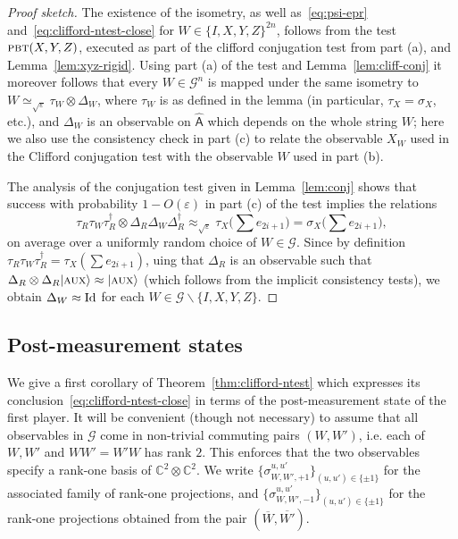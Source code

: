 \documentclass[11pt]{article}
\theoremstyle{remark}
\theoremstyle{definition}
\newcommand{\ket}[1]{|#1\rangle}
\newcommand{\Id}{\ensuremath{\mathop{\rm Id}\nolimits}}
\newcommand{\reg}[1]{{\textsf{#1}}}
\newcommand{\C}{\ensuremath{\mathbb{C}}}
\newcommand{\eps}{\varepsilon}
\newcommand{\pbt}{\textsc{pbt}}
\newcommand{\aux}{\textsc {aux}}
\begin{document}
\begin{proof}[Proof sketch]
The existence of the isometry, as well as~\eqref{eq:psi-epr} and~\eqref{eq:clifford-ntest-close} for $W \in \{I,X,Y,Z\}^{2n}$, follows from the test $\pbt(X,Y,Z)$, executed as part of the clifford conjugation test from part (a), and Lemma~\ref{lem:xyz-rigid}. 
Using part (a) of the test and Lemma~\ref{lem:cliff-conj} it moreover follows that every $W \in \mathcal{G}^n$ is mapped under the same isometry to $W \simeq_{\sqrt{\eps}} \tau_W \otimes \Delta_{W}$, where $\tau_W$ is as defined in the lemma (in particular, $\tau_X = \sigma_X$, etc.), and  $\Delta_W$ is an observable on $\hat{\reg{A}}$ which depends on the whole string $W$; 
 here we also use the consistency check in part (c) to relate  the observable $X_W$ used in the Clifford conjugation test with the observable $W$ used in part (b). 

The analysis of the conjugation test given in Lemma~\ref{lem:conj} shows that success with probability $1-O(\eps)$ in part (c) of the test implies the relations 
$$\tau_R \tau_W \tau_R^\dagger \otimes \Delta_R \Delta_W \Delta_R^\dagger \approx_{\sqrt{\eps}} \tau_X\big(\sum {e_{2i+1}}\big) = \sigma_X\big(\sum {e_{2i+1}}\big),$$
 on average over a uniformly random choice of $W\in \mathcal{G}$. Since by definition $\tau_R \tau_W \tau_R^\dagger = \tau_X(\sum e_{2i+1})$, uing that $\Delta_R$ is an observable such that $\Delta_R\otimes \Delta_R\ket{\aux}\approx\ket{\aux}$ (which follows from the implicit consistency tests), we obtain $\Delta_W \approx \Id$ for each $W\in\mathcal{G}\backslash\{I,X,Y,Z\}$. 

\end{proof}


\subsection{Post-measurement states}

We give a first corollary of Theorem~\ref{thm:clifford-ntest} which expresses its conclusion~\eqref{eq:clifford-ntest-close} in terms of the post-measurement state of the first player. It will be convenient (though not necessary) to assume that all observables in $\mathcal{G}$ come in non-trivial commuting pairs $(W,W')$, i.e. each of $W, W'$ and $WW'=W'W$ has rank $2$. This enforces that the two observables specify a rank-one basis of $\C^2\otimes \C^2$. We write $\{\sigma_{W,W',+1}^{u,u'}\}_{(u,u')\in\{\pm 1\}}$ for the associated family of rank-one projections, and $\{\sigma_{W,W',-1}^{u,u'}\}_{(u,u')\in\{\pm 1\}}$ for the rank-one projections obtained from the pair $(\overline{W},\overline{W'})$. 
\end{document}
